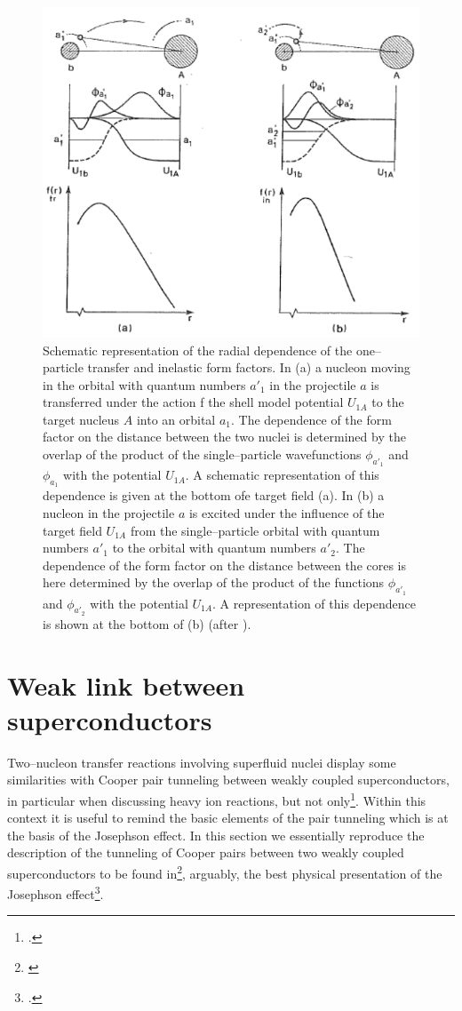 \begin{figure}
\centerline{\includegraphics*[width=\textwidth,angle=0.3]{nutshell/figs/fig2B3.pdf}}
\caption{Schematic representation of the radial dependence of the one--particle transfer and inelastic form factors. In (a) a nucleon moving in the orbital with quantum numbers $a'_1$ in the projectile $a$ is transferred under the action f the shell model potential $U_{1A}$ to the target nucleus $A$ into an orbital $a_1$. The dependence of the form factor on the distance between the two nuclei is determined by the overlap of the product of the single--particle wavefunctions $\phi_{a'_1}$ and $\phi_{a_1}$ with the potential $U_{1A}$. A schematic representation of this dependence is given at the bottom ofe target field  (a). In (b) a nucleon in the projectile $a$ is excited under the influence of the target field $U_{1A}$ from the single--particle orbital with quantum numbers $a'_1$ to the orbital with quantum numbers $a'_2$. The dependence of the form factor on the distance between the cores is here determined by the overlap of the product of the functions $\phi_{a'_1}$ and $\phi_{a'_2}$ with the potential $U_{1A}$. A representation of  this dependence is shown at the bottom of (b) (after \cite{Broglia:05c}).}\label{fig_4}
\end{figure}

\section{Weak link between superconductors}\label{C3AppC}
Two--nucleon transfer reactions involving superfluid nuclei display some similarities with Cooper pair tunneling between weakly coupled superconductors, in particular when discussing heavy ion reactions, but not only\footnote{\cite{vonOertzen:01,Oertzen:13,Broglia:04a}.}. Within this context it is useful to remind the basic elements of the pair tunneling which is at the basis of the Josephson effect. 
In this section we essentially reproduce the description of the tunneling of Cooper pairs between two weakly coupled superconductors to be found in\footnote{\cite{Anderson:64b}}, arguably, the best physical presentation of the Josephson effect\footnote{\cite{Josephson:62}.}.


